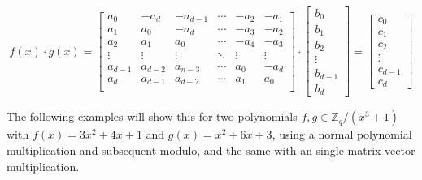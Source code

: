 $$
  f(x) \cdot g(x)
  =
  \begin{bmatrix}
    a_0     & -a_{d}  & -a_{d-1} & \cdots & -a_2   & -a_1   \\
    a_1     & a_0     & -a_{d}   & \cdots & -a_3   & -a_2   \\
    a_2     & a_1     & a_0      & \cdots & -a_4   & -a_3   \\
    \vdots  & \vdots  & \vdots   & \ddots & \vdots & \vdots \\
    a_{d-1} & a_{d-2} & a_{n-3}  & \cdots & a_0    & -a_{d} \\
    a_{d}   & a_{d-1} & a_{d-2}  & \cdots & a_1    & a_0    \\
  \end{bmatrix}
  \cdot
  \begin{bmatrix}
    b_0     \\
    b_1     \\
    b_2     \\
    \vdots  \\
    b_{d-1} \\
    b_{d}
  \end{bmatrix}
  = 
  \begin{bmatrix}
    c_0     \\
    c_1     \\
    c_2     \\
    \vdots  \\
    c_{d-1} \\
    c_{d}
  \end{bmatrix}
$$

The following examples will show this for two polynomials $f, g \in \mathbb{Z}_q/(x^3+1)$ with $f(x) = 3x^2+4x+1$ and $g(x) = x^2+6x+3$, using a normal polynomial multiplication and subsequent modulo, and the same with an single matrix-vector multiplication.

